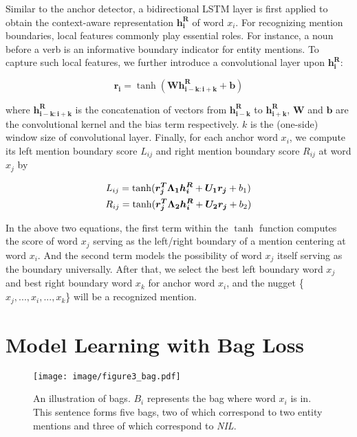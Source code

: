 \documentclass[11pt,a4paper]{article}
\begin{document}
Similar to the anchor detector, a bidirectional LSTM layer is first applied to obtain the context-aware representation $\bm{h^{R}_i}$ of word $x_i$. For recognizing mention boundaries, local features commonly play essential roles. For instance, a noun before a verb is an informative boundary indicator for entity mentions. To capture such local features, we further introduce a convolutional layer upon $\bm{h^{R}_i}$:

\begin{small}
\begin{equation}
\bm{r_{i}} = \tanh(\bm{W} \bm{h^R_{i-k:i+k}} + \bm{b})
\end{equation}
\end{small}where $\bm{h^R_{i-k:i+k}}$ is the concatenation of vectors from $\bm{h^R_{i-k}}$ to $\bm{h^R_{i+k}}$, $\bm{W}$ and $\bm{b}$ are the convolutional kernel and the bias term respectively. $k$ is the (one-side) window size of convolutional layer. Finally, for each anchor word $x_i$, we compute its left mention boundary score $L_{ij}$ and right mention boundary score $R_{ij}$ at word $x_j$ by

\begin{small}
\begin{equation}
  \centering
  \begin{gathered}
    L_{ij} = \tanh (\bm{r_j^T \Lambda_1 h^R_i} + \bm{U_1r_j} + b_1) \\
    R_{ij} = \tanh (\bm{r_j^T \Lambda_2 h^R_i} + \bm{U_2r_j} + b_2)\\
  \end{gathered}
\end{equation}
\end{small}In the above two equations, the first term within the $\tanh$ function computes the score of word $x_j$ serving as the left/right boundary of a mention centering at word $x_i$. And the second term models the possibility of word $x_j$ itself serving as the boundary universally.
After that, we select the best left boundary word $x_j$ and best right boundary word $x_k$ for anchor word $x_i$, and the nugget \{$x_j,...,x_i,...,x_k$\} will be a recognized mention.




\section{Model Learning with Bag Loss}


\begin{figure*}
  \centering
  \setlength{\belowcaptionskip}{-0.4cm}
  \texttt{[image: image/figure3\_bag.pdf]}\\
  \caption{An illustration of bags. $B_i$ represents the bag where word $x_i$ is in. This sentence forms five bags, two of which correspond to two entity mentions and three of which correspond to \emph{NIL}.}
  \label{fig:bags}
\end{figure*}
\end{document}
